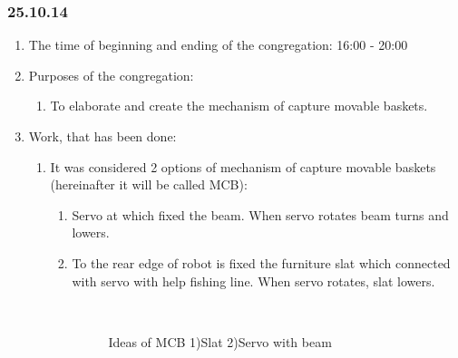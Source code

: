 
\subsubsection{25.10.14}

\begin{enumerate}
	\item The time of beginning and ending of the congregation:
	16:00 - 20:00
	\item Purposes of the congregation:
	\begin{enumerate}
	  \item To elaborate and create the mechanism of capture movable baskets. 
	  
    \end{enumerate}
    
	\item Work, that has been done:
	\begin{enumerate}
	  \item It was considered 2 options of mechanism of capture movable baskets (hereinafter it will be called MCB):
	  \begin{enumerate}
	    \item Servo at which fixed the beam. When servo rotates beam turns and lowers.
	    
	    \item To the rear edge of robot is fixed  the furniture slat which connected with servo with help fishing line. When servo rotates, slat lowers.
	    
	    \begin{figure}[H]
	    	\begin{minipage}[h]{0.2\linewidth}
	    		\center   
	    	\end{minipage}
	    	\begin{minipage}[h]{0.6\linewidth}
	    		\caption{Ideas of MCB 1)Slat 2)Servo with beam}
	    	\end{minipage}
	    \end{figure}
	    

\end{enumerate}
\end{enumerate}
\end{enumerate}
